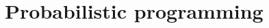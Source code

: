 \documentclass[./main]{subfiles}
\begin{document}
\section{Probabilistic programming}
\end{document}
